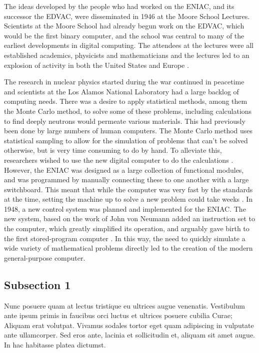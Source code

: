 The ideas developed by the people who had worked on the ENIAC, and its successor the EDVAC, were disseminated in 1946 at the Moore School Lectures. Scientists at the Moore School had already begun
work on the EDVAC, which would be the first binary computer, and the school was central to many of the earliest developments in digital computing. The attendees at the lectures were all established
academics, physicists and mathematicians and the lectures led to an explosion of activity in both the United States and Europe \cite{Davis2008}.

The research in nuclear physics started during the war continued in peacetime and scientists at the Los Alamos National Laboratory had a large backlog of computing needs. There was a desire to apply
statistical methods, among them the Monte Carlo method, to solve some of these problems, including calculations to find deeply neutrons would permeate various materials. This had previously been done
by large numbers of human computers. The Monte Carlo method uses statistical sampling to allow for the simulation of problems that can't be solved otherwise, but is very time consuming to do by hand.
To alleviate this, researchers wished to use the new digital computer to do the calculations \cite{Haigh2014}. However, the ENIAC was designed as a large collection of functional modules, and was
programmed by manually connecting these to one another with a large switchboard. This meant that while the computer was very fast by the standards at the time, setting the machine up to solve a new
problem could take weeks \cite{Rope2007}. In 1948, a new control system was planned and implemented for the ENIAC. The new system, based on the work of John von Neumann \cite{VonNeumann1993}
\cite{Haigh2014a} added an instruction set to the computer, which greatly simplified its operation, and arguably gave birth to the first stored-program computer \cite{Rope2007}. In this way, the need
to quickly simulate a wide variety of mathematical problems directly led to the creation of the modern general-purpose computer.


\subsection{Subsection 1}
Nunc posuere quam at lectus tristique eu ultrices augue venenatis. Vestibulum ante ipsum primis in faucibus orci luctus et ultrices posuere cubilia Curae; Aliquam erat volutpat. Vivamus sodales tortor eget quam adipiscing in vulputate ante ullamcorper. Sed eros ante, lacinia et sollicitudin et, aliquam sit amet augue. In hac habitasse platea dictumst.

